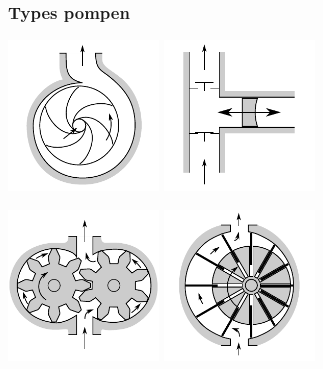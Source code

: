 \documentclass[t]{beamer}
\begin{document}
  	\begin{frame}
  		\frametitle{Types pompen}
  		\center
  		\includegraphics[width=0.3\textwidth]{../fig/leidingstelsels/Centrifugaalpomp}
  		\hspace{2cm}
  		\includegraphics[width=0.3\textwidth]{../fig/leidingstelsels/Zuigerpomp}
  		
  		\vspace{0.5cm}
  		\includegraphics[width=0.3\textwidth]{../fig/leidingstelsels/Tandradpomp}
  		\hspace{2cm}
  		\includegraphics[width=0.3\textwidth]{../fig/leidingstelsels/Schottenpomp}
    \end{frame} 
\end{document}
